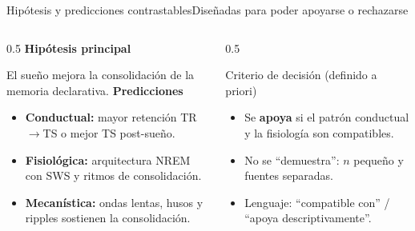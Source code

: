 \documentclass[aspectratio=169,11pt,t]{beamer}
\begin{document}
\begin{frame}{Hipótesis y predicciones contrastables}{Diseñadas para poder apoyarse o rechazarse}
  \begin{columns}[T,onlytextwidth]
    \begin{column}{0.5\textwidth}
      \textbf{\color{navy}Hipótesis principal}\par\vskip2pt
      El sueño mejora la consolidación de la memoria declarativa.
      \vskip6pt
      \textbf{\color{navy}Predicciones}\par\vskip2pt
      \begin{itemize}\setlength\itemsep{2pt}
        \item \textbf{Conductual:} mayor retención TR$\to$TS o mejor TS post-sueño.
        \item \textbf{Fisiológica:} arquitectura NREM con SWS y ritmos de consolidación.
        \item \textbf{Mecanística:} ondas lentas, husos y ripples sostienen la consolidación.
      \end{itemize}
    \end{column}
    \begin{column}{0.5\textwidth}
      \begin{block}{Criterio de decisión (definido a priori)}
        \begin{itemize}\setlength\itemsep{2pt}
          \item Se \textbf{apoya} si el patrón conductual y la fisiología son compatibles.
          \item No se ``demuestra'': $n$ pequeño y fuentes separadas.
          \item Lenguaje: ``compatible con'' / ``apoya descriptivamente''.
        \end{itemize}
      \end{block}
    \end{column}
  \end{columns}
\end{frame}
\end{document}
